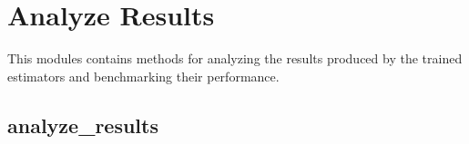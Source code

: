 \documentclass[letterpaper,10pt,english]{sphinxmanual}
\begin{document}
\section{Analyze Results}
\label{\detokenize{analyze_results:analyze-results}}\label{\detokenize{analyze_results::doc}}\label{\detokenize{analyze_results:id1}}
This modules contains methods for analyzing the results produced by the trained estimators and benchmarking their performance.


\subsection{analyze\_results}
\label{\detokenize{analyze_results:id2}}\label{\detokenize{analyze_results:module-mleap.analyze_results.analyze_results}}
\end{document}

